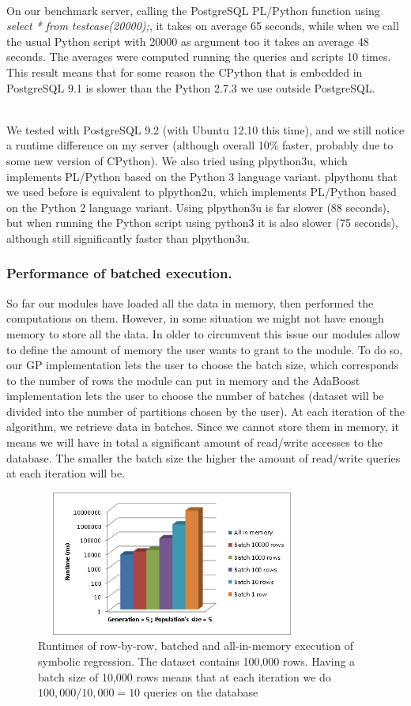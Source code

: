 ~~\\
On our benchmark server, calling the PostgreSQL PL/Python function using \textit{select * from testcase(20000);}, it takes on average 65 seconds, while when we call the usual Python script with 20000 as argument too it takes an average 48 seconds. The averages were computed running the queries and scripts 10 times. This result means that for some reason the CPython that is embedded in PostgreSQL 9.1 is slower than the Python 2.7.3 we use outside PostgreSQL.

~~\\
We tested with PostgreSQL 9.2 (with Ubuntu 12.10 this time), and we still notice a runtime difference on my server (although overall 10\% faster, probably due to some new version of CPython). We also tried using plpython3u, which implements PL/Python based on the Python 3 language variant. plpythonu that we used before is equivalent to plpython2u, which implements PL/Python based on the Python 2 language variant. Using plpython3u is far slower (88 seconds), but when running the Python script using python3 it is also slower (75 seconds), although still significantly faster than plpython3u.

\subsubsection*{Performance of batched execution.}
So far our modules have loaded all the data in memory, then performed the computations on them. However, in some situation we might not have enough memory to store all the data. In older to circumvent this issue our modules allow to define the amount of memory the user wants to grant to the module. To do so, our GP implementation lets the user to choose the batch size, which corresponds to the number of rows the module can put in memory and the AdaBoost implementation lets the user to choose the number of batches (dataset will be divided into the number of partitions chosen by the user). At each iteration of the algorithm, we retrieve data in batches. Since we cannot store them in memory, it means we will have in total a significant amount of read/write accesses to the database. The smaller the batch size the higher the amount of read/write queries at each iteration will be.
\begin{figure}[ht]
\centering
\includegraphics[width=0.8\textwidth,height=180px]{gp-batch-histo.png}
\caption{Runtimes of row-by-row, batched and all-in-memory execution of symbolic regression. The dataset contains 100,000 rows. Having a batch size of 10,000 rows means that at each iteration we do $100,000/10,000 = 10$ queries on the database}
\label{fig:gp-batch-histo}
\end{figure}

